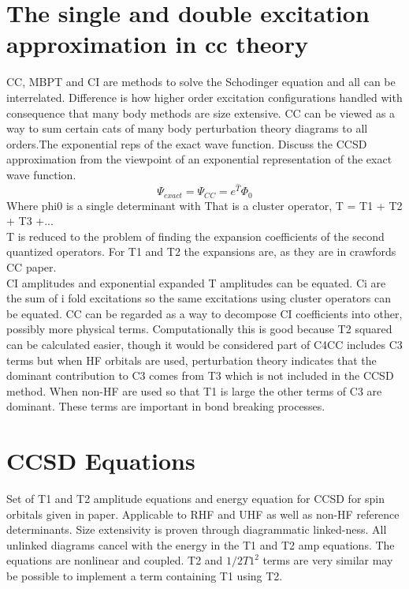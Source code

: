\documentclass[10pt, draft]{article}
\begin{document}
  \section{The single and double excitation approximation in cc theory}
  CC, MBPT and CI are methods to solve the Schodinger equation and all can be interrelated. Difference is how higher order excitation configurations handled with consequence that many body methods are size extensive.  CC can be viewed as a way to sum certain cats of many body perturbation theory diagrams to all orders.The exponential reps of the exact wave function. Discuss the CCSD approximation from the viewpoint of an exponential representation of the exact wave function.  
 \[\Psi_{exact} = \Psi_{CC} = e^{\hat{T}}\Phi_0\]
  Where phi0 is a single determinant with That is a cluster operator, T = T1 + T2 + T3 +... \\
  T is reduced to the problem of finding the expansion coefficients of the second quantized operators.  For T1 and T2 the expansions are, as they are in crawfords CC paper.\\
  CI amplitudes and exponential expanded T amplitudes can be equated.  Ci are the sum of i fold excitations so the same excitations using cluster operators can be equated.  \linebreak[1]
  CC can be regarded as a way to  decompose CI coefficients into other, possibly more physical terms.  Computationally this is good because T2 squared can be calculated easier, though it would be considered part of C4\linebreak[1]
  CC includes C3 terms but when HF orbitals are used, perturbation theory indicates that the dominant contribution to C3 comes from T3 which is not included in the CCSD method.  When non-HF are used so that T1 is large the other terms of C3 are dominant. These terms are important in bond breaking processes.  
  
   
  \section{CCSD Equations}
  Set of T1 and T2 amplitude equations and energy equation for CCSD for spin orbitals given in paper.  Applicable to RHF and UHF as well as non-HF reference determinants.  Size extensivity is proven through diagrammatic linked-ness.  All unlinked diagrams cancel with the energy in the T1 and T2 amp equations.  The equations are nonlinear and coupled. T2 and $1/2T1^2$ terms are very similar may be possible to implement a term containing T1 using T2.
  
\end{document}
